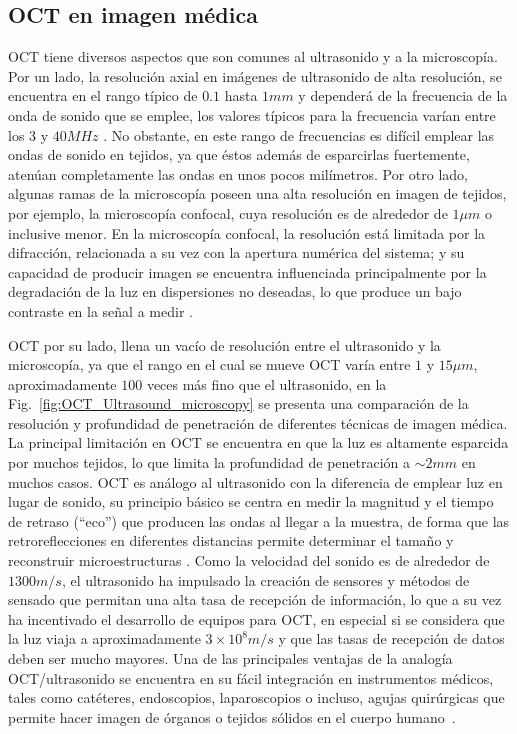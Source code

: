 \subsection{OCT en imagen médica}

OCT tiene diversos aspectos que son comunes al ultrasonido y a la microscopía. Por un lado, la resolución axial en imágenes de ultrasonido de alta resolución, se encuentra en el rango típico de $0.1$ hasta $1mm$ y dependerá de la frecuencia de la onda de sonido que se emplee, los valores típicos para la frecuencia varían entre los $3$ y $40MHz$ \cite{Szabo}. No obstante, en este rango de frecuencias es difícil emplear las ondas de sonido en tejidos, ya que éstos además de esparcirlas fuertemente, atenúan completamente las ondas en unos pocos milímetros. Por otro lado, algunas ramas de la microscopía poseen una alta resolución en imagen de tejidos, por ejemplo, la microscopía confocal, cuya resolución es de alrededor de $1\mu m$ o inclusive menor. En la microscopía confocal, la resolución está limitada por la difracción, relacionada a su vez con la apertura numérica del sistema; y su capacidad de producir imagen se encuentra influenciada principalmente por la degradación de la luz en dispersiones no deseadas, lo que produce un bajo contraste en la señal a medir \cite{Pawley}. 

OCT por su lado, llena un vacío de resolución entre el ultrasonido y la microscopía, ya que el rango en el cual se mueve OCT varía entre $1$ y $15 \mu m$, aproximadamente $100$ veces más fino que el ultrasonido, en la Fig.~\ref{fig:OCT_Ultrasound_microscopy} se presenta una comparación de la resolución y profundidad de penetración de diferentes técnicas de imagen médica. La principal limitación en OCT se encuentra en que la luz es altamente esparcida por muchos tejidos, lo que limita la profundidad de penetración a $\sim 2mm$ en muchos casos.
OCT es análogo al ultrasonido con la diferencia de emplear luz en lugar de sonido, su principio básico se centra en medir la magnitud y el tiempo de retraso (``eco'') que producen las ondas al llegar a la muestra, de forma que las retroreflecciones en diferentes distancias permite determinar el tamaño y reconstruir microestructuras \cite{Szabo}. Como la velocidad del sonido es de alrededor de $1300m/s$, el ultrasonido ha impulsado la creación de sensores y métodos de sensado que permitan una alta tasa de recepción de información, lo que a su vez ha incentivado el desarrollo de equipos para OCT, en especial si se considera que la luz viaja a aproximadamente $3\times 10^8 m/s$ y que las tasas de recepción de datos deben ser mucho mayores. Una de las principales ventajas de la analogía OCT/ultrasonido se encuentra en su fácil integración en instrumentos médicos, tales como catéteres, endoscopios, laparoscopios o incluso, agujas quirúrgicas que permite hacer imagen de órganos o tejidos sólidos \invivo en el cuerpo humano~\cite{Tearney1996, Tearney1997_2}.

